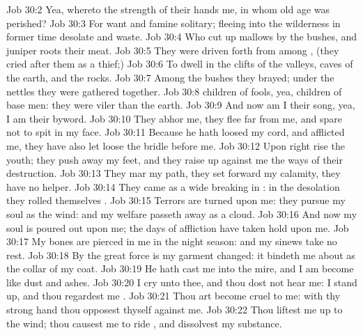\vs Job 30:2 Yea, whereto  the strength of their hands  me, in whom old age was perished?
\vs Job 30:3 For want and famine  solitary; fleeing into the wilderness in former time desolate and waste.
\vs Job 30:4 Who cut up mallows by the bushes, and juniper roots  their meat.
\vs Job 30:5 They were driven forth from among , (they cried after them as  a thief;)
\vs Job 30:6 To dwell in the clifts of the valleys,  caves of the earth, and  the rocks.
\vs Job 30:7 Among the bushes they brayed; under the nettles they were gathered together.
\vs Job 30:8  children of fools, yea, children of base men: they were viler than the earth.
\vs Job 30:9 And now am I their song, yea, I am their byword.
\vs Job 30:10 They abhor me, they flee far from me, and spare not to spit in my face.
\vs Job 30:11 Because he hath loosed my cord, and afflicted me, they have also let loose the bridle before me.
\vs Job 30:12 Upon  right  rise the youth; they push away my feet, and they raise up against me the ways of their destruction.
\vs Job 30:13 They mar my path, they set forward my calamity, they have no helper.
\vs Job 30:14 They came  as a wide breaking in : in the desolation they rolled themselves .
\vs Job 30:15 Terrors are turned upon me: they pursue my soul as the wind: and my welfare passeth away as a cloud.
\vs Job 30:16 And now my soul is poured out upon me; the days of affliction have taken hold upon me.
\vs Job 30:17 My bones are pierced in me in the night season: and my sinews take no rest.
\vs Job 30:18 By the great force  is my garment changed: it bindeth me about as the collar of my coat.
\vs Job 30:19 He hath cast me into the mire, and I am become like dust and ashes.
\vs Job 30:20 I cry unto thee, and thou dost not hear me: I stand up, and thou regardest me .
\vs Job 30:21 Thou art become cruel to me: with thy strong hand thou opposest thyself against me.
\vs Job 30:22 Thou liftest me up to the wind; thou causest me to ride , and dissolvest my substance.
